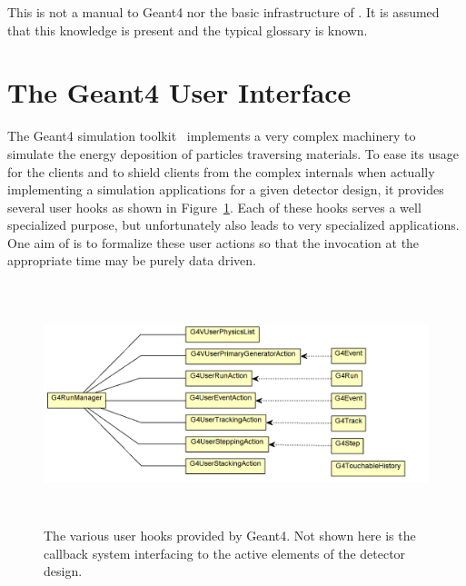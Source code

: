 \documentclass[10pt,a4paper]{article}
\begin{document}
\noindent
This is not a manual to Geant4 nor the basic infrastructure of \DDhep.
It is assumed that this knowledge is present and the typical glossary 
is known.

\section{The Geant4 User Interface}
\label{sec:ddg4-user-manual-geant4-interface}

\noindent
The Geant4 simulation toolkit~\cite{bib:geant4} implements a very complex
machinery to simulate the energy deposition of particles traversing materials.
To ease its usage for the clients and to shield clients from the complex
internals when actually implementing a simulation applications for a 
given detector design, it provides several user hooks
as shown in Figure~\ref{fig:ddg4-g4runmanager-anatomy}. Each of these hooks 
serves a well specialized purpose, but unfortunately also leads to very 
specialized applications. One aim of \DDG is to formalize these user 
actions so that the invocation at the appropriate time may be purely
data driven.
\begin{figure}[h]
  \begin{center}
    \includegraphics[height=70mm] {DDG4-G4RunManagerAnatomy.png}
    \caption{The various user hooks provided by Geant4. Not shown here
              is the callback system interfacing to the active elements
              of the detector design.}
    \label{fig:ddg4-g4runmanager-anatomy}
  \end{center}
\end{figure}
\end{document}
